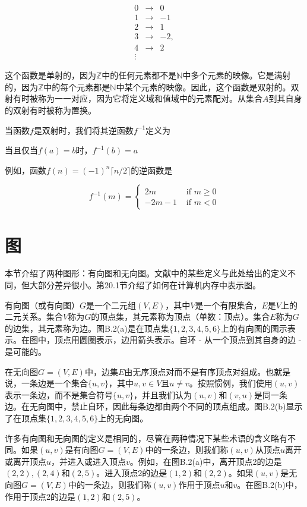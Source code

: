 \documentclass[lang=cn,newtx,10pt,scheme=chinese]{elegantbook}
\begin{document}
$$
\begin{array}{ccr}
0 & \rightarrow & 0 \\
1 & \rightarrow & -1 \\
2 & \rightarrow & 1 \\
3 & \rightarrow & -2, \\
4 & \rightarrow & 2 \\
\vdots &
\end{array}
$$

这个函数是单射的，因为$\mathbb{Z}$中的任何元素都不是$\mathbb{N}$中多个元素的映像。它是满射的，因为$\mathbb{Z}$中的每个元素都是$\mathbb{N}$中某个元素的映像。因此，这个函数是双射的。双射有时被称为一一对应，因为它将定义域和值域中的元素配对。从集合$A$到其自身的双射有时被称为置换。

当函数$f$是双射时，我们将其逆函数$f^{-1}$定义为

当且仅当$f(a)=b$时，$f^{-1}(b)=a$

例如，函数$f(n)=(-1)^n\lceil n / 2\rceil$的逆函数是

$$
f^{-1}(m)= \begin{cases}2 m & \text { if } m \geq 0 \\ -2 m-1 & \text { if } m<0\end{cases}
$$

\section{图}

本节介绍了两种图形：有向图和无向图。文献中的某些定义与此处给出的定义不同，但大部分差异很小。第20.1节介绍了如何在计算机内存中表示图。

有向图（或有向图）$G$是一个二元组$(V, E)$，其中$V$是一个有限集合，$E$是$V$上的二元关系。集合$V$称为$G$的顶点集，其元素称为顶点（单数：顶点）。集合$E$称为$G$的边集，其元素称为边。图B.2(a)是在顶点集$\{1,2,3,4,5,6\}$上的有向图的图示表示。在图中，顶点用圆圈表示，边用箭头表示。自环 - 从一个顶点到其自身的边 - 是可能的。

在无向图$G=(V, E)$中，边集$E$由无序顶点对而不是有序顶点对组成。也就是说，一条边是一个集合$\{u, v\}$，其中$u,v \in V$且$u \neq v$。按照惯例，我们使用$(u,v)$表示一条边，而不是集合符号$\{u,v\}$，并且我们认为$(u,v)$和$(v,u)$是同一条边。在无向图中，禁止自环，因此每条边都由两个不同的顶点组成。图B.2(b)显示了在顶点集$\{1,2,3,4,5,6\}$上的无向图。

许多有向图和无向图的定义是相同的，尽管在两种情况下某些术语的含义略有不同。如果$(u,v)$是有向图$G=(V,E)$中的一条边，则我们称$(u,v)$从顶点$u$离开或离开顶点$u$，并进入或进入顶点$v$。例如，在图B.2(a)中，离开顶点2的边是$(2,2),(2,4)$和$(2,5)$。进入顶点2的边是$(1,2)$和$(2,2)$。如果$(u,v)$是无向图$G=(V,E)$中的一条边，则我们称$(u,v)$作用于顶点$u$和$v$。在图B.2(b)中，作用于顶点2的边是$(1,2)$和$(2,5)$。
\end{document}
